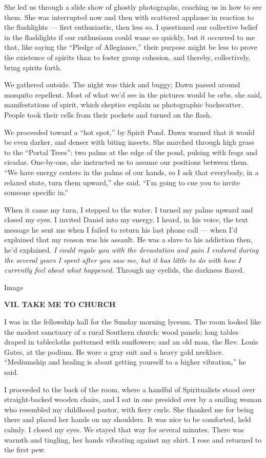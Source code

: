 She led us through a slide show of ghostly photographs, coaching us in
how to see them. She was interrupted now and then with scattered
applause in reaction to the flashlights --- first enthusiastic, then
less so. I questioned our collective belief in the flashlights if our
enthusiasm could wane so quickly, but it occurred to me that, like
saying the ``Pledge of Allegiance,'' their purpose might be less to
prove the existence of spirits than to foster group cohesion, and
thereby, collectively, bring spirits forth.

We gathered outside. The night was thick and buggy; Dawn passed around
mosquito repellent. Most of what we'd see in the pictures would be orbs,
she said, manifestations of spirit, which skeptics explain as
photographic backscatter. People took their cells from their pockets and
turned on the flash.

We proceeded toward a ``hot spot,'' by Spirit Pond. Dawn warned that it
would be even darker, and denser with biting insects. She marched
through high grass to the ``Portal Trees'': two palms at the edge of the
pond, pulsing with frogs and cicadas. One-by-one, she instructed us to
assume our positions between them. ``We have energy centers in the palms
of our hands, so I ask that everybody, in a relaxed state, turn them
upward,'' she said. ``I'm going to cue you to invite someone specific
in.''

When it came my turn, I stepped to the water. I turned my palms upward
and closed my eyes. I invited Daniel into my energy. I heard, in his
voice, the text message he sent me when I failed to return his last
phone call --- when I'd explained that my reason was his assault. He was
a slave to his addiction then, he'd explained. \emph{I could regale you
with the devastation and pain I endured during the several years I spent
after you saw me, but it has little to do with how I currently feel
about what happened.} Through my eyelids, the darkness flared.

Image

\textbf{VII. TAKE ME TO CHURCH}

I was in the fellowship hall for the Sunday morning lyceum. The room
looked like the modest sanctuary of a rural Southern church: wood
panels; long tables draped in tablecloths patterned with sunflowers; and
an old man, the Rev. Louis Gates, at the podium. He wore a gray suit and
a heavy gold necklace. ``Mediumship and healing is about getting
yourself to a higher vibration,'' he said.

I proceeded to the back of the room, where a handful of Spiritualists
stood over straight-backed wooden chairs, and I sat in one presided over
by a smiling woman who resembled my childhood pastor, with fiery curls.
She thanked me for being there and placed her hands on my shoulders. It
was nice to be comforted, held calmly. I closed my eyes. We stayed that
way for several minutes. There was warmth and tingling, her hands
vibrating against my shirt. I rose and returned to the first pew.

